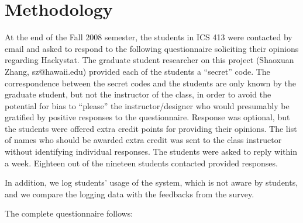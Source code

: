 \documentclass[11pt]{article}
\begin{document}
\section{Methodology}
At the end of the Fall 2008 semester, the students in ICS 413 were contacted by email and asked to respond to the following questionnaire soliciting their opinions regarding Hackystat. The graduate student researcher on this project (Shaoxuan Zhang, sz@hawaii.edu) provided each of the students a ``secret'' code. The correspondence between the secret codes and the students are only known by the graduate student, but not the instructor of the class, in order to avoid the potential for bias to ``please'' the instructor/designer who would presumably be gratified by positive responses to the questionnaire. Response was optional, but the students were offered extra credit points for providing their opinions. The list of names who should be awarded extra credit was sent to the class instructor without identifying individual responses. The students were asked to reply within a week. Eighteen out of the nineteen students contacted provided responses. 

In addition, we log students' usage of the system, which is not aware by students, and we compare the logging data with the feedbacks from the survey.

The complete questionnaire follows:
\end{document}
